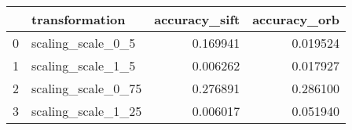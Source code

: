 \begin{tabular}{llrr}
\toprule
 & transformation & accuracy_sift & accuracy_orb \\
\midrule
0 & scaling_scale_0_5 & 0.169941 & 0.019524 \\
1 & scaling_scale_1_5 & 0.006262 & 0.017927 \\
2 & scaling_scale_0_75 & 0.276891 & 0.286100 \\
3 & scaling_scale_1_25 & 0.006017 & 0.051940 \\
\bottomrule
\end{tabular}
